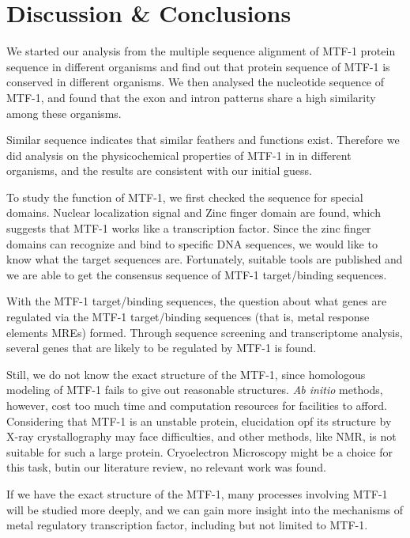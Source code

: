 \section{Discussion \& Conclusions}

We started our analysis from the multiple sequence alignment of MTF-1 protein sequence in different organisms and find out that protein sequence of MTF-1 is conserved in different organisms. We then analysed the nucleotide sequence of MTF-1, and found that the exon and intron patterns share a high similarity among these organisms.

Similar sequence indicates that similar feathers and functions exist. Therefore we did analysis on the physicochemical properties of MTF-1 in in different organisms, and the results are consistent with our initial guess.

To study the function of MTF-1, we first checked the sequence for special domains. Nuclear localization signal and Zinc finger domain are found, which suggests that MTF-1 works like a transcription factor. Since the zinc finger domains can recognize and bind to specific DNA sequences, we would like to know what the target sequences are. Fortunately, suitable tools are published and we are able to get the consensus sequence of MTF-1 target/binding sequences.

With the MTF-1 target/binding sequences, the question about what genes are regulated via the MTF-1 target/binding sequences (that is, metal response elements MREs) formed. Through sequence screening and transcriptome analysis, several genes that are likely to be regulated by MTF-1 is found.

Still, we do not know the exact structure of the MTF-1, since homologous modeling of MTF-1 fails to give out reasonable structures. \textit{Ab initio} methods, however, cost too much time and computation resources for facilities to afford. Considering that MTF-1 is an unstable protein, elucidation opf its structure by X-ray crystallography may face difficulties, and other methods, like NMR, is not suitable for such a large protein. Cryoelectron Microscopy might be a choice for this task, butin our literature review, no relevant work was found.

If we have the exact structure of the MTF-1, many processes involving MTF-1 will be studied more deeply, and we can gain more insight into the mechanisms of metal regulatory transcription factor, including but not limited to MTF-1.